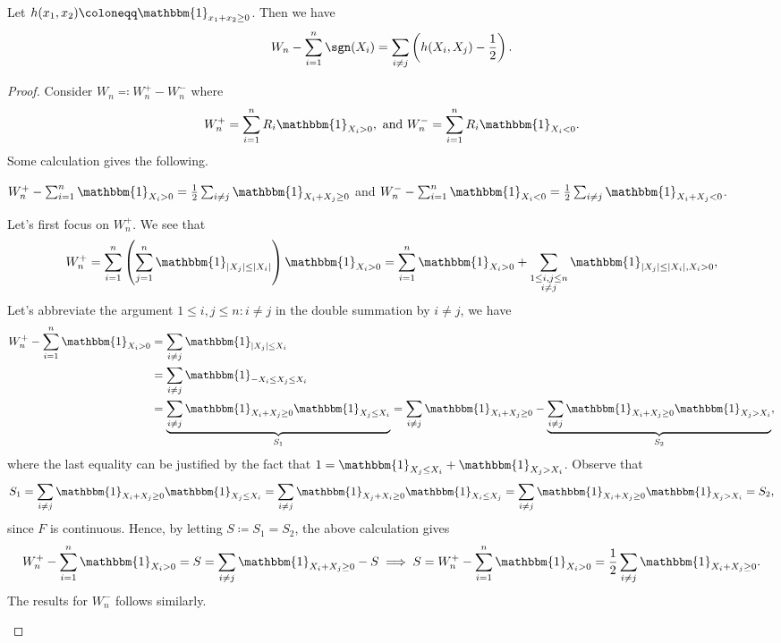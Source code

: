 \begin{proposition}\label{prop:Wilcoxon-signed-rank-test}
	Let \(h(x_1, x_2) \coloneqq \mathbbm{1}_{x_1 + x_2 \geq 0}\). Then we have
	\[
		W_n - \sum_{i=1}^{n} \sgn (X_i)
		= \sum_{i \neq j} \left( h(X_i , X_j) - \frac{1}{2} \right).
	\]
\end{proposition}
\begin{proof}
	Consider \(W_n \eqqcolon W_n^+ - W_n^-\) where
	\[
		W_n^+ = \sum_{i=1}^{n} R_i \mathbbm{1}_{X_i > 0} ,\text{ and }
		W_n^- = \sum_{i=1}^{n} R_i \mathbbm{1}_{X_i < 0}.
	\]
	Some calculation gives the following.

	\begin{claim}
		\(W_n^+ - \sum_{i=1}^{n} \mathbbm{1}_{X_i > 0} = \frac{1}{2} \sum_{i \neq j} \mathbbm{1}_{X_i + X_j \geq 0}\) and \(W_n^- - \sum_{i=1}^{n} \mathbbm{1}_{X_i < 0} = \frac{1}{2} \sum_{i \neq j} \mathbbm{1}_{X_i + X_j < 0}\).
	\end{claim}
	\begin{explanation}
		Let's first focus on \(W_n^+\). We see that
		\[
			W_n^+
			= \sum_{i=1}^{n} \left( \sum_{j=1}^{n} \mathbbm{1}_{\vert X_j \vert \leq \vert X_i \vert } \right) \mathbbm{1}_{X_i > 0}
			= \sum_{i=1}^{n} \mathbbm{1}_{X_i > 0} + \sum_{\substack{1 \leq i, j \leq n \\ i \neq j}} \mathbbm{1}_{\vert X_j \vert \leq \vert X_i \vert , X_i > 0} ,
		\]
		Let's abbreviate the argument \(1 \leq i, j \leq n \colon i \neq j\) in the double summation by \(i \neq j\), we have
		\[
			\begin{split}
				W_n^+ - \sum_{i=1}^{n} \mathbbm{1}_{X_i > 0}
				 & = \sum_{i \neq j} \mathbbm{1}_{\vert X_j \vert \leq X_i}                                       \\
				 & = \sum_{i \neq j} \mathbbm{1}_{-X_i \leq X_j \leq X_i}                                         \\
				 & = \underbrace{\sum_{i \neq j} \mathbbm{1}_{X_i + X_j \geq 0} \mathbbm{1}_{X_j \leq X_i}}_{S_1}
				= \sum_{i \neq j} \mathbbm{1}_{X_i + X_j \geq 0} - \underbrace{\sum_{i \neq j} \mathbbm{1}_{X_i + X_j \geq 0} \mathbbm{1}_{X_j > X_i}}_{S_2},
			\end{split}
		\]
		where the last equality can be justified by the fact that \(1 = \mathbbm{1}_{X_j \leq X_i} + \mathbbm{1}_{X_j > X_i} \). Observe that
		\[
			S_1
			= \sum_{i \neq j} \mathbbm{1}_{X_i + X_j \geq 0} \mathbbm{1}_{X_j \leq X_i}
			= \sum_{i \neq j} \mathbbm{1}_{X_j + X_i \geq 0} \mathbbm{1}_{X_i \leq X_j}
			= \sum_{i \neq j} \mathbbm{1}_{X_i + X_j \geq 0} \mathbbm{1}_{X_j > X_i}
			= S_2,
		\]
		since \(F\) is continuous. Hence, by letting \(S \coloneqq S_1 = S_2\), the above calculation gives
		\[
			W_n^+ - \sum_{i=1}^{n} \mathbbm{1}_{X_i > 0}
			= S
			= \sum_{i \neq j} \mathbbm{1}_{X_i + X_j \geq 0} - S
			\implies S
			= W_n^+ - \sum_{i=1}^{n} \mathbbm{1}_{X_i > 0}
			= \frac{1}{2} \sum_{i \neq j} \mathbbm{1}_{X_i + X_j \geq 0}.
		\]
		The results for \(W_n^-\) follows similarly.
	\end{explanation}


\end{proof}
